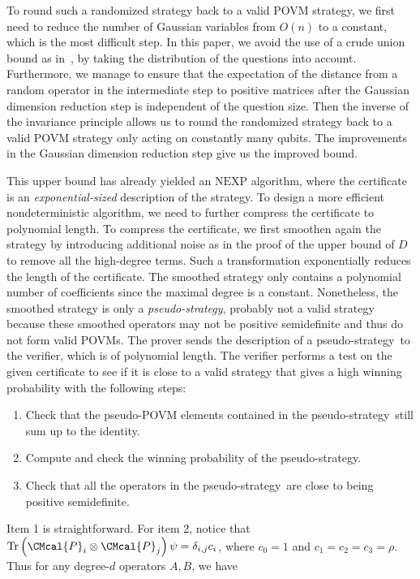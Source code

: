 \documentclass[10pt,a4paper]{article}
\def\P{\CMcal{P}}
\theoremstyle{plain}
\theoremstyle{definition}
\newcommand {\br} [1] {\ensuremath{ \left( #1 \right) }}
\newcommand {\Tr} {\ensuremath{ \mathrm{Tr} }}
\newcommand{\pseudostrategy} {pseudo-strategy}
\newcommand{\1}{\mathbb{1}} %
\newcommand{\NEXP}{\mathrm{NEXP}}
\begin{document}
To round such a randomized strategy back to a valid POVM strategy, we first need to reduce the number of Gaussian variables from $O(n)$ to a constant, which is the most difficult step. 
In this paper, we avoid the use of a crude union bound as in~\cite{qin2021nonlocal}, by taking the distribution of the questions into account. 
Furthermore, we manage to ensure that the expectation of the distance from a random operator in the intermediate step to positive matrices after the Gaussian dimension reduction step is independent of the question size.
Then the inverse of the invariance principle allows us to round the randomized strategy back to a valid POVM strategy only acting on constantly many qubits. 
The improvements in the Gaussian dimension reduction step give us the improved bound.
 
 This upper bound has already yielded an $\NEXP$ algorithm, where the certificate is an {\em exponential-sized} description of the strategy. 
To design a more efficient nondeterministic algorithm, we need to further compress the certificate to polynomial length. 
To compress the certificate, we first smoothen again the strategy by introducing additional noise as in the proof of the upper bound of $D$ to remove all the high-degree terms.
Such a transformation exponentially reduces the length of the certificate. 
The smoothed strategy only contains a polynomial number of coefficients since the maximal degree is a constant. Nonetheless, the smoothed strategy is only a  {\em \pseudostrategy}, probably not a valid strategy because these smoothed operators may not be positive semidefinite and thus do not form valid POVMs. 
The prover sends the description of a \pseudostrategy~to the verifier, which is of polynomial length. The verifier performs a test on the given certificate to see if it is close to a valid strategy that gives a high winning probability with
the following steps:
\begin{enumerate}
  \item Check that the pseudo-POVM elements contained in the \pseudostrategy~still sum up to the identity.
  \item Compute and check the winning probability of the \pseudostrategy.
  \item Check that all the operators in the \pseudostrategy~are close to being positive semidefinite.
\end{enumerate}
Item 1 is straightforward. For item 2, notice that $\Tr\br{\P_i\otimes\P_j}\psi=\delta_{i,j} c_i$, where $c_0=1$ and $c_1=c_2=c_3=\rho$. Thus for any degree-$d$ operators $A,B$, we have 
\end{document}
